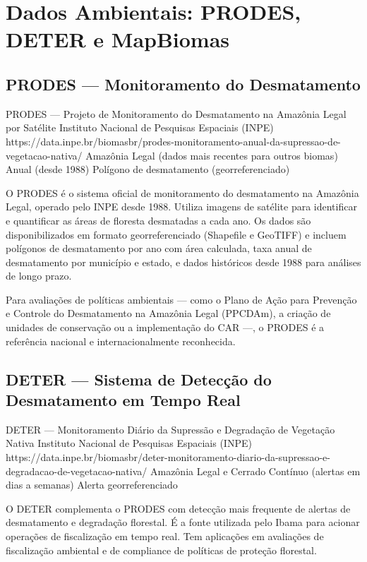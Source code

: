 \section{Dados Ambientais: PRODES, DETER e MapBiomas}

\subsection{PRODES --- Monitoramento do Desmatamento}

\ficharapida
  {PRODES --- Projeto de Monitoramento do Desmatamento na Amazônia Legal por Satélite}
  {Instituto Nacional de Pesquisas Espaciais (INPE)}
  {https://data.inpe.br/biomasbr/prodes-monitoramento-anual-da-supressao-de-vegetacao-nativa/}
  {Amazônia Legal (dados mais recentes para outros biomas)}
  {Anual (desde 1988)}
  {Polígono de desmatamento (georreferenciado)}

O PRODES é o sistema oficial de monitoramento do desmatamento na Amazônia Legal, operado pelo INPE desde 1988. Utiliza imagens de satélite para identificar e quantificar as áreas de floresta desmatadas a cada ano. Os dados são disponibilizados em formato georreferenciado (Shapefile e GeoTIFF) e incluem polígonos de desmatamento por ano com área calculada, taxa anual de desmatamento por município e estado, e dados históricos desde 1988 para análises de longo prazo.

Para avaliações de políticas ambientais --- como o Plano de Ação para Prevenção e Controle do Desmatamento na Amazônia Legal (PPCDAm), a criação de unidades de conservação ou a implementação do CAR ---, o PRODES é a referência nacional e internacionalmente reconhecida.

\subsection{DETER --- Sistema de Detecção do Desmatamento em Tempo Real}

\ficharapida
  {DETER --- Monitoramento Diário da Supressão e Degradação de Vegetação Nativa}
  {Instituto Nacional de Pesquisas Espaciais (INPE)}
  {https://data.inpe.br/biomasbr/deter-monitoramento-diario-da-supressao-e-degradacao-de-vegetacao-nativa/}
  {Amazônia Legal e Cerrado}
  {Contínuo (alertas em dias a semanas)}
  {Alerta georreferenciado}

O DETER complementa o PRODES com detecção mais frequente de alertas de desmatamento e degradação florestal. É a fonte utilizada pelo Ibama para acionar operações de fiscalização em tempo real. Tem aplicações em avaliações de fiscalização ambiental e de compliance de políticas de proteção florestal.

